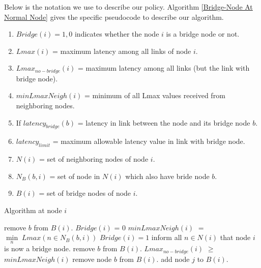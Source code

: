 \documentclass[letterpaper, 10 pt, conference]{ieeeconf}  %
\begin{document}
Below is the notation we use to describe our policy. Algorithm \ref{Bridge-Node At Normal Node} gives the specific pseudocode to describe our algorithm.

\begin{enumerate}
\item $Bridge(i) = {1,0}$ indicates whether the node $i$ is a bridge node or not.
\item $Lmax(i)$ = maximum latency among all links of node $i$.
\item $Lmax_{no-bridge}(i)$ = maximum latency among all links (but the link with bridge node).
\item $minLmaxNeigh(i)$ = minimum of all Lmax values received from neighboring nodes.
\item If $latency_{bridge}(b)$ = latency in link between the node and its bridge node $b$.
\item $latency_{limit}$ = maximum allowable latency value in link with bridge node.
\item $N(i)$ = set of neighboring nodes of node $i$.
\item $N_{B}(b,i)$ = set of node in $N(i)$ which also have bride node $b$.
\item $B(i)$ = set of bridge nodes of node $i$.
\end{enumerate}


\begin{algorithm}
\caption{Algorithm at node $i$}
\label{Bridge-Node At Normal Node}
\begin{algorithmic} 
\State remove $b$ from $B(i)$.
\Else \; {$Bridge(i)$ = 0}
\State $minLmaxNeigh(i)$ $=$ $\min \limits_{n} \; Lmax(n \in N_{B}(b,i))$
\State $Bridge(i) = 1$
\State inform all $n \in N(i)$ that node $i$ is now a bridge node. 
\State remove $b$ from $B(i)$.
\Else \; {$Lmax_{no-bridge}(i)$ $\geq$ $minLmaxNeigh(i)$}
\State remove node $b$ from $B(i)$.
\State add node $j$ to $B(i)$.
\EndIf
\EndFor
\EndIf
\EndIf
\EndIf
\EndFor
\end{algorithmic}
\end{algorithm}
\end{document}
